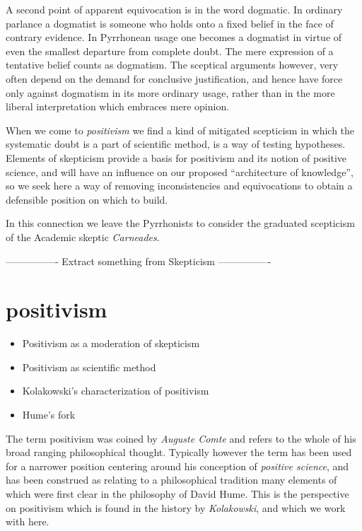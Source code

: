 A second point of apparent equivocation is in the word dogmatic.
In ordinary parlance a dogmatist is someone who holds onto a fixed belief in the face of contrary evidence.
In Pyrrhonean usage one becomes a dogmatist in virtue of even the smallest departure from complete doubt.
The mere expression of a tentative belief counts as dogmatism.
The sceptical arguments however, very often depend on the demand for conclusive justification, and hence have force only against dogmatism in its more ordinary usage, rather than in the more liberal interpretation which embraces mere opinion.

When we come to {\it positivism} we find a kind of mitigated scepticism in which the systematic doubt is a part of scientific method, is a way of testing hypotheses.
Elements of skepticism provide a basis for positivism and its notion of positive science, and will have an influence on our proposed ``architecture of knowledge'', so we seek here a way of removing inconsistencies and equivocations to obtain a defensible position on which to build.

In this connection we leave the Pyrrhonists to consider the graduated scepticism of the Academic skeptic {\it Carneades}.

---------------- Extract something from Skepticism ----------------


\section{positivism}

\begin{itemize}
\item Positivism as a moderation of skepticism
\item Positivism as scientific method
\item Kolakowski's characterization of positivism
\item Hume's fork
\end{itemize}

The term positivism was coined by \emph{Auguste Comte} and refers to the whole of his broad ranging philosophical thought.
Typically however the term has been used for a narrower position centering around his conception of \emph{positive science}, and has been construed as relating to a philosophical tradition many elements of which were first clear in the philosophy of David Hume.
This is the perspective on positivism which is found in the history by \emph{Kolakowski}\cite{kolakowski66}, and which we work with here.

